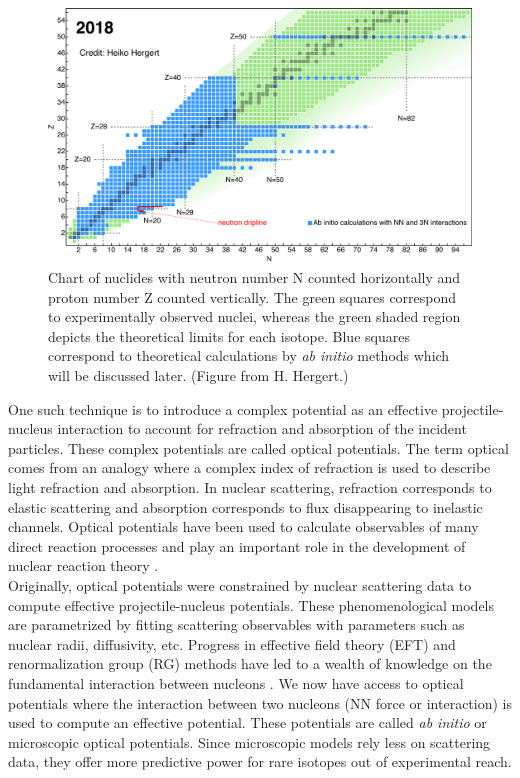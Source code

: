 \documentclass[preprintnumbers,floatfix,aps,prc,preprint,nofootinbib]{revtex4-1}
\begin{document}
%
\begin{figure}
	\captionsetup{singlelinecheck=false,justification=raggedright}
	\centering
	\includegraphics[width=14cm]{nuclear_chart_2018}
	\caption{Chart of nuclides with neutron number N counted horizontally and proton number Z counted vertically. The green squares correspond to experimentally observed nuclei, whereas the green shaded region depicts the theoretical limits for each isotope. Blue squares correspond to theoretical calculations by \textit{ab initio} methods which will be discussed later. (Figure from H. Hergert.)}
	\label{fig:nuclear_chart_2018}
\end{figure}
%

One such technique is to introduce a complex potential as an effective projectile-nucleus interaction to account for refraction and absorption of the incident particles. These complex potentials are called optical potentials. The term optical comes from an analogy where a complex index of refraction is used to describe light refraction and absorption. In nuclear scattering, refraction corresponds to elastic scattering and absorption corresponds to flux disappearing to inelastic channels. Optical potentials have been used to calculate observables of many direct reaction processes and play an important role in the development of nuclear reaction theory \cite{thompson_nunes_2009}.
\\

Originally, optical potentials were constrained by nuclear scattering data to compute effective projectile-nucleus potentials. These phenomenological models are parametrized by fitting scattering observables with parameters such as nuclear radii, diffusivity, etc. Progress in effective field theory (EFT) and renormalization group (RG) methods have led to a wealth of knowledge on the fundamental interaction between nucleons \cite{Epelbaum:2008ga}. We now have access to optical potentials where the interaction between two nucleons (NN force or interaction) is used to compute an effective potential. These potentials are called \textit{ab initio} or microscopic optical potentials. Since microscopic models rely less on scattering data, they offer more predictive power for rare isotopes out of experimental reach.
\\
\end{document}
